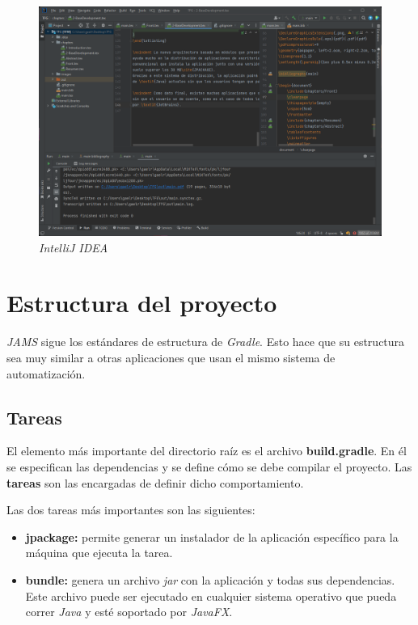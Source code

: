 \begin{figure}[h]
    \centering
    \includegraphics[width=\textwidth]{images/base/intellij-idea}
    \caption{\textit{IntelliJ IDEA}}
    \label{fig:java-intellij-idea}
\end{figure}


\section{Estructura del proyecto}\label{sec:estructura-del-proyecto}

\textit{JAMS} sigue los estándares de estructura de \textit{Gradle}\cite{GRADLE_ORGANIZING}.
Esto hace que su estructura sea muy similar a otras aplicaciones que usan el mismo
sistema de automatización.

\subsection{Tareas}\label{subsec:tareas}

El elemento más importante del directorio raíz es el archivo \textbf{build.gradle}.
En él se especifican las dependencias y se define cómo se debe compilar el proyecto.
Las \textbf{tareas} son las encargadas de definir dicho comportamiento.

Las dos tareas más importantes son las siguientes:
\begin{itemize}
    \item \textbf{jpackage:} permite generar un instalador de la aplicación específico
    para la máquina que ejecuta la tarea.
    \item \textbf{bundle:} genera un archivo \textit{jar} con la aplicación y todas
    sus dependencias.
    Este archivo puede ser ejecutado en cualquier sistema operativo que pueda correr
    \textit{Java} y esté soportado por \textit{JavaFX}.
\end{itemize}

